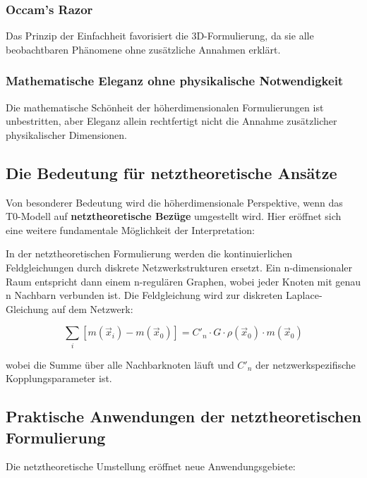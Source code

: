 \documentclass[12pt,a4paper]{report}
\begin{document}
	\subsubsection{Occam's Razor}
	Das Prinzip der Einfachheit favorisiert die 3D-Formulierung, da sie alle beobachtbaren Phänomene ohne zusätzliche Annahmen erklärt.
	
	\subsubsection{Mathematische Eleganz ohne physikalische Notwendigkeit}
	Die mathematische Schönheit der höherdimensionalen Formulierungen ist unbestritten, aber Eleganz allein rechtfertigt nicht die Annahme zusätzlicher physikalischer Dimensionen.
	
	\subsection{Die Bedeutung für netztheoretische Ansätze}
	
	Von besonderer Bedeutung wird die höherdimensionale Perspektive, wenn das T0-Modell auf \textbf{netztheoretische Bezüge} umgestellt wird. Hier eröffnet sich eine weitere fundamentale Möglichkeit der Interpretation:
	
	In der netztheoretischen Formulierung werden die kontinuierlichen Feldgleichungen durch diskrete Netzwerkstrukturen ersetzt. Ein n-dimensionaler Raum entspricht dann einem n-regulären Graphen, wobei jeder Knoten mit genau n Nachbarn verbunden ist. Die Feldgleichung wird zur diskreten Laplace-Gleichung auf dem Netzwerk:
	
	\begin{equation}
		\sum_{i} [m(\vec{x}_i) - m(\vec{x}_0)] = C'_n \cdot G \cdot \rho(\vec{x}_0) \cdot m(\vec{x}_0)
	\end{equation}
	
	wobei die Summe über alle Nachbarknoten läuft und $C'_n$ der netzwerkspezifische Kopplungsparameter ist.
	
	\subsection{Praktische Anwendungen der netztheoretischen Formulierung}
	
	Die netztheoretische Umstellung eröffnet neue Anwendungsgebiete:
	
\end{document}
